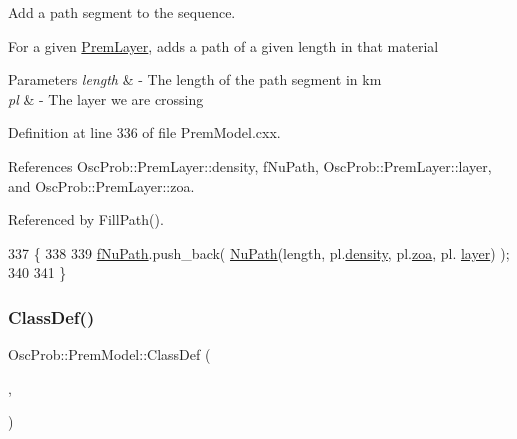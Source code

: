 Add a path segment to the sequence.

For a given \hyperlink{structOscProb_1_1PremLayer}{Prem\+Layer}, adds a path of a given length in that material


\begin{DoxyParams}{Parameters}
{\em length} & -\/ The length of the path segment in km \\
\hline
{\em pl} & -\/ The layer we are crossing \\
\hline
\end{DoxyParams}


Definition at line 336 of file Prem\+Model.\+cxx.



References Osc\+Prob\+::\+Prem\+Layer\+::density, f\+Nu\+Path, Osc\+Prob\+::\+Prem\+Layer\+::layer, and Osc\+Prob\+::\+Prem\+Layer\+::zoa.



Referenced by Fill\+Path().


\begin{DoxyCode}
337 \{
338 
339   \hyperlink{classOscProb_1_1PremModel_aaf3c77e35798d664853157013c90ad2b}{fNuPath}.push\_back( \hyperlink{structOscProb_1_1NuPath}{NuPath}(length, pl.\hyperlink{structOscProb_1_1PremLayer_aba2536cbdab87d0db33df47f95c4f2c3}{density}, pl.\hyperlink{structOscProb_1_1PremLayer_a8687a8169d786fca79908292d11077f5}{zoa}, pl.
      \hyperlink{structOscProb_1_1PremLayer_aca8d7df68e6f982155b68b7e6a7ef389}{layer}) );
340 
341 \}
\end{DoxyCode}
\mbox{\label{classOscProb_1_1PremModel_a9a1d78e29217bb0dd00ae3bd96d22b69}} 
\subsubsection{\texorpdfstring{Class\+Def()}{ClassDef()}}
{\footnotesize\ttfamily Osc\+Prob\+::\+Prem\+Model\+::\+Class\+Def (\begin{DoxyParamCaption}\item[{\hyperlink{classOscProb_1_1PremModel}{Prem\+Model}}]{,  }\item[{1}]{ }\end{DoxyParamCaption})\hspace{0.3cm}{\ttfamily [protected]}}

\mbox{\label{classOscProb_1_1PremModel_aaead53a9385bda9b0219fd051d0cdd11}} 
